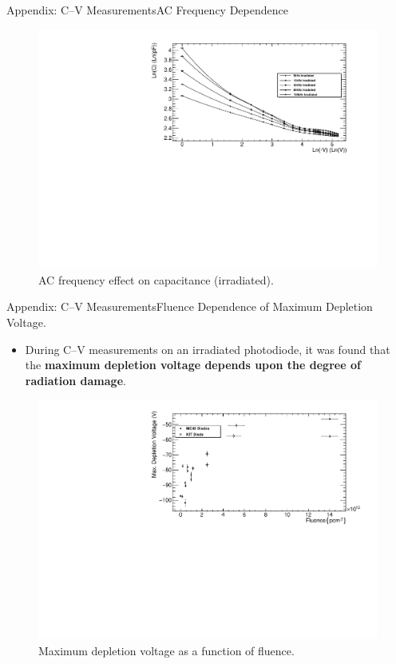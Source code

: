 \documentclass{beamer}
\begin{document}
    \begin{frame}{Appendix: C--V Measurements}{AC Frequency Dependence}
        \begin{figure}
            \centering
            \includegraphics[width = 0.9\linewidth]{Diode3_CV_0802_prettygraph.pdf}
            \caption{AC frequency effect on capacitance (irradiated).}
            \label{fig:freqcvirradiated}
        \end{figure}
    \end{frame}
    
    \begin{frame}{Appendix: C--V Measurements}{Fluence Dependence of Maximum Depletion Voltage.}
        \begin{itemize}
            \item During C--V measurements on an irradiated photodiode, it was found that the \textbf{maximum depletion voltage depends upon the degree of radiation damage}.
        \end{itemize}
        \begin{figure}
            \centering
            \includegraphics[width = 0.9\linewidth]{MaxDepletion_vs_fluence_alldata_0503.pdf}
            \vspace{-0.3cm}
            \caption{Maximum depletion voltage as a function of fluence.}
            \label{fig:maxdepletionfluence}
        \end{figure}
    \end{frame}
    
\end{document}
